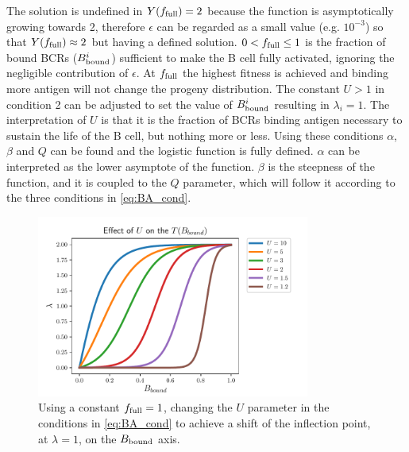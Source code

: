 The solution is undefined in $Y(f_{\text{full}}) = 2$ because the function is asymptotically growing towards 2, therefore $\epsilon$ can be regarded as a small value (e.g. $10^{-3}$) so that $Y(f_{\text{full}}) \approx 2$ but having a defined solution.
$0 < f_{\text{full}} \leq 1$ is the fraction of bound BCRs ($B^i_{\text{bound}}$) sufficient to make the B cell fully activated, ignoring the negligible contribution of $\epsilon$.
At $f_{\text{full}}$ the highest fitness is achieved and binding more antigen will not change the progeny distribution.
The constant $U > 1$ in condition 2 can be adjusted to set the value of $B^i_{\text{bound}}$ resulting in $\lambda_i = 1$.
The interpretation of $U$ is that it is the fraction of BCRs binding antigen necessary to sustain the life of the B cell, but nothing more or less.
Using these conditions $\alpha$, $\beta$ and $Q$ can be found and the logistic function is fully defined.
$\alpha$ can be interpreted as the lower asymptote of the function.
$\beta$ is the steepness of the function, and it is coupled to the $Q$ parameter, which will follow it according to the three conditions in \eqref{eq:BA_cond}.
\vfill

\begin{figure}
    \centering
    \includegraphics[width=0.8\textwidth]{figures/T_Bbound_U.pdf}
    \caption{
        \label{fig:T_Bbound_U}
        Using a constant $f_{\text{full}} = 1$, changing the $U$ parameter in the conditions in \eqref{eq:BA_cond} to achieve a shift of the inflection point, at $\lambda=1$, on the $B_{\text{bound}}$ axis.
    }
\end{figure}

